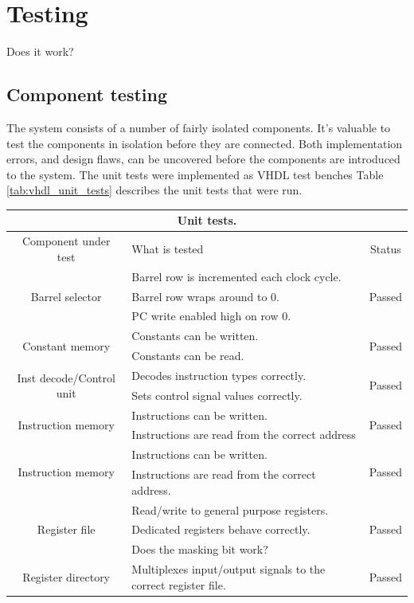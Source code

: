 \documentclass[../main/report.tex]{subfiles}
\begin{document}
\chapter{Testing}

Does it work?


\section{Component testing}
The system consists of a number of fairly isolated components.
It's valuable to test the components in isolation before they are connected.
Both implementation errors, and design flaws, can be uncovered before the components are introduced to the system.
The unit tests were implemented as VHDL test benches
Table \ref{tab:vhdl_unit_tests} describes the unit tests that were run.
\begin{table}[H]
	\centering
	\begin{tabularx}{\textwidth}{|c|X|c|}
	\hline
	\multicolumn{3}{|c|}{Unit tests.} \\
	\hline  Component under test & What is tested  	  & Status \\ 
	\hline  \multirow{3}{*}{Barrel selector} 		  & Barrel row is incremented each clock cycle.  & \multirow{3}{*}{ Passed } \\
	 										 		  & Barrel row wraps around to 0. & \\			
	 										 		  & PC write enabled high on row 0.& \\								
	\hline  \multirow{2}{*}{Constant memory} 	      & Constants can be written.  & \multirow{2}{*}{ Passed } \\
	 										 		  & Constants can be read. & \\												
	\hline \multirow{2}{*}{Inst decode/Control unit}  & Decodes instruction types correctly. & \multirow{2}{*}{ Passed } \\
		   											  & Sets control signal values correctly. &\\
	\hline \multirow{2}{*}{Instruction memory} 		  & Instructions can be written. & \multirow{2}{*}{ Passed } \\
													  & Instructions are read from the correct address  & \\ 
	\hline \multirow{2}{*}{Instruction memory} 		  & Instructions can be written. & \multirow{2}{*}{ Passed } \\
													  & Instructions are read from the correct address.  & \\ 
	\hline \multirow{3}{*}{Register file} 		  	  & Read/write to general purpose registers. & \multirow{3}{*}{ Passed } \\
													  & Dedicated registers behave correctly.  & \\ 
													  & Does the masking bit work?  & \\ 													  
	\hline  Register directory 		 				  & Multiplexes input/output signals to the correct register file. & Passed  \\
	

\end{tabularx}
\end{table}
\end{document}
